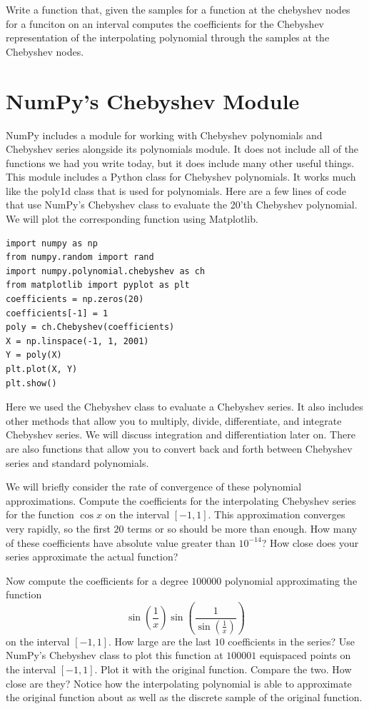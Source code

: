 \begin{problem}
Write a function that, given the samples for a function at the chebyshev nodes for a funciton on an interval computes the coefficients for the Chebyshev representation of the interpolating polynomial through the samples at the Chebyshev nodes.
\end{problem}

\section*{NumPy's Chebyshev Module}

NumPy includes a module for working with Chebyshev polynomials and Chebyshev series alongside its polynomials module.
It does not include all of the functions we had you write today, but it does include many other useful things.
This module includes a Python class for Chebyshev polynomials.
It works much like the poly1d class that is used for polynomials.
Here are a few lines of code that use NumPy's Chebyshev class to evaluate the 20'th Chebyshev polynomial.
We will plot the corresponding function using Matplotlib.
\begin{lstlisting}
import numpy as np
from numpy.random import rand
import numpy.polynomial.chebyshev as ch
from matplotlib import pyplot as plt
coefficients = np.zeros(20)
coefficients[-1] = 1
poly = ch.Chebyshev(coefficients)
X = np.linspace(-1, 1, 2001)
Y = poly(X)
plt.plot(X, Y)
plt.show()
\end{lstlisting}

Here we used the Chebyshev class to evaluate a Chebyshev series.
It also includes other methods that allow you to multiply, divide, differentiate, and integrate Chebyshev series.
We will discuss integration and differentiation later on.
There are also functions that allow you to convert back and forth between Chebyshev series and standard polynomials.

\begin{problem}
\label{prob:cheb_interpolations}
We will briefly consider the rate of convergence of these polynomial approximations.
Compute the coefficients for the interpolating Chebyshev series for the function $\cos x$ on the interval $[-1, 1]$.
This approximation converges very rapidly, so the first $20$ terms or so should be more than enough.
How many of these coefficients have absolute value greater than $10^{-14}$?
How close does your series approximate the actual function?

Now compute the coefficients for a degree $100000$ polynomial approximating the function
\[\sin \left( \frac{1}{x} \right) \sin \left( \frac{1}{\sin \left( \frac{1}{x} \right)} \right) \]
on the interval $[-1, 1]$.
How large are the last $10$ coefficients in the series?
Use NumPy's Chebyshev class to plot this function at $100001$ equispaced points on the interval $[-1, 1]$.
Plot it with the original function.
Compare the two.
How close are they?
Notice how the interpolating polynomial is able to approximate the original function about as well as the discrete sample of the original function.
\end{problem}

